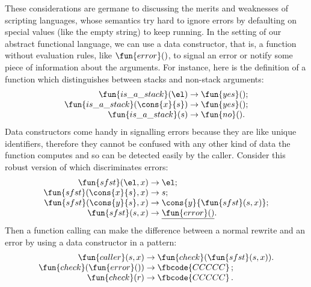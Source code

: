 These considerations are germane to discussing the merits and
weaknesses of scripting languages, whose semantics try hard to ignore
errors by defaulting on special values (like the empty string) to keep
running. In the setting of our abstract functional language, we can
use a data constructor, that is, a function without evaluation rules,
like \(\fun{error}()\), to signal an error or notify some piece of
information about the arguments. For instance, here is the definition
of a function which distinguishes between stacks and non\hyp{}stack
arguments:
\begin{equation*}
\begin{array}{r@{\;}l@{\;}l}
\fun{is\_a\_stack}(\el) & \rightarrow & \fun{yes}();\\
\fun{is\_a\_stack}(\cons{x}{s}) & \rightarrow & \fun{yes}();\\
\fun{is\_a\_stack}(s) & \rightarrow & \fun{no}().
\end{array}
\end{equation*}
Data constructors come handy in signalling errors because they are
like unique identifiers, therefore they cannot be confused with any
other kind of data the function computes and so can be detected easily
by the caller. Consider this robust version of
 which discriminates errors:
\begin{equation*}
\begin{array}{r@{\;}l@{\;}l}
\fun{sfst}(\el, x) & \rightarrow & \el;\\
\fun{sfst}(\cons{x}{s},x) & \rightarrow & s;\\
\fun{sfst}(\cons{y}{s},x) & \rightarrow & \cons{y}{\fun{sfst}(s,x)};\\
\fun{sfst}(s,x) & \rightarrow & \underline{\fun{error}()}.
\end{array}
\end{equation*}
Then a function calling  can make the difference between a
normal rewrite and an error by using a data constructor in a pattern:
\begin{equation*}
\begin{array}{r@{\;}l@{\;}l}
\fun{caller}(s,x) & \rightarrow & \fun{check}(\fun{sfst}(s,x)).\\
\fun{check}(\fun{error}()) & \rightarrow & \fbcode{CCCCC}\,;\\
\fun{check}(r) & \rightarrow & \fbcode{CCCCC}\,.
\end{array}
\end{equation*}

